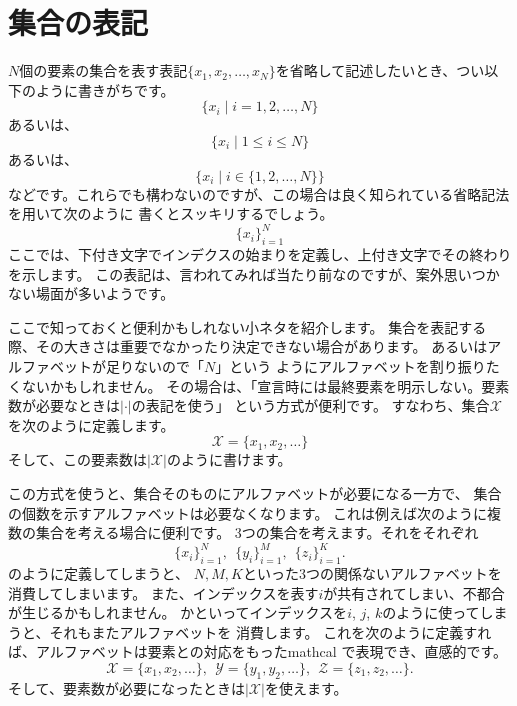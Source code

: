 \documentclass[uplatex,twocolumn,9pt,dvipdfmx]{jsarticle}
\begin{document}
\section{集合の表記}

$N$個の要素の集合を表す表記$\{x_1, x_2, \dots, x_N\}$を省略して記述したいとき、つい以下のように書きがちです。
\begin{equation}
    \{x_i \mid i=1, 2, \dots, N \}
\end{equation}
あるいは、
\begin{equation}
    \{x_i \mid 1 \le i \le N \}
\end{equation}
あるいは、
\begin{equation}
    \{x_i \mid i \in \{1, 2, \dots, N\} \}
\end{equation}
などです。これらでも構わないのですが、この場合は良く知られている省略記法を用いて次のように
書くとスッキリするでしょう。
\begin{equation}
    \{ x_i \}_{i=1}^N
\end{equation}
ここでは、下付き文字でインデクスの始まりを定義し、上付き文字でその終わりを示します。
この表記は、言われてみれば当たり前なのですが、案外思いつかない場面が多いようです。

ここで知っておくと便利かもしれない小ネタを紹介します。
集合を表記する際、その大きさは重要でなかったり決定できない場合があります。
あるいはアルファベットが足りないので「$N$」という
ようにアルファベットを割り振りたくないかもしれません。
その場合は、「宣言時には最終要素を明示しない。要素数が必要なときは$|\cdot|$の表記を使う」
という方式が便利です。
すなわち、集合$\mathcal{X}$を次のように定義します。
\begin{equation}
    \mathcal{X} = \{x_1, x_2, \dots \}
\end{equation}
そして、この要素数は$\vert \mathcal{X} \vert$のように書けます。

この方式を使うと、集合そのものにアルファベットが必要になる一方で、
集合の個数を示すアルファベットは必要なくなります。
これは例えば次のように複数の集合を考える場合に便利です。
3つの集合を考えます。それをそれぞれ
\begin{equation}
\{x_i\}_{i=1}^N, ~~ \{y_i\}_{i=1}^M, ~~ \{z_i\}_{i=1}^K.
\end{equation}
のように定義してしまうと、 $N, M, K$といった3つの関係ないアルファベットを消費してしまいます。
また、インデックスを表す$i$が共有されてしまい、不都合が生じるかもしれません。
かといってインデックスを$i$, $j$, $k$のように使ってしまうと、それもまたアルファベットを
消費します。
これを次のように定義すれば、アルファベットは要素との対応をもったmathcal
で表現でき、直感的です。
\begin{equation}
\mathcal{X} = \{x_1, x_2, \dots \}, ~~ 
\mathcal{Y} = \{y_1, y_2, \dots \}, ~~ 
\mathcal{Z} = \{z_1, z_2, \dots \}.
\end{equation}
そして、要素数が必要になったときは$\vert \mathcal{X} \vert$を使えます。
\end{document}
